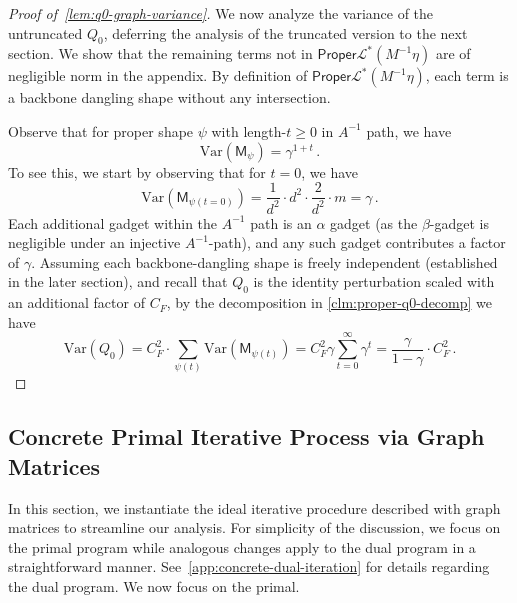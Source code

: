 \documentclass[12pt]{article}
\def \al {\alpha}
\newcommand{\Var}{\mathrm{Var}}
\newcommand{\gam}{\gamma}
\newcommand{\cm}{\mathsf{M} }
\newcommand{\todo}[1]{\textcolor{red}{(#1)}}
\newcommand{\Authornote}[3]{{\sf\footnotesize\color{#3}{[#1: #2]}}}
\newcommand{\Authornote}[3]{}
\newcommand{\anote}[1]{\Authornote{Aaron}{#1}{cyan}}
\begin{document}
\begin{proof}[Proof of~\cref{lem:q0-graph-variance}]
    We now analyze the variance of the untruncated $Q_0$, deferring the analysis of the truncated version to the next section. We show that the remaining terms not in $\mathsf{Proper}\mathcal{L}^{*}(M^{-1}\eta)$ are of negligible norm in the appendix. By definition of $\mathsf{Proper}\mathcal{L}^{*}(M^{-1}\eta)$, each term is a backbone dangling shape without any intersection.
	
	Observe that for proper shape $\psi$ with length-$t\geq 0$ in $A^{-1}$ path, we have \[ 
	\Var(\cm_\psi) = \gam^{1+t}\,.
	\]
	To see this, we start by observing that for $t=0$, we have \[ 
	\Var(\cm_{\psi(t=0)} ) = \frac{1}{d^2} \cdot d^2 \cdot \frac{2}{d^2} \cdot m = \gam \,.
	\]
	Each additional gadget within the $A^{-1}$ path is an $\al$ gadget (as the $\beta$-gadget is negligible under an injective $A^{-1}$-path), and any such gadget contributes a factor of $\gam$. Assuming each backbone-dangling shape is freely independent (established in the later section), and recall that $Q_0$ is the identity perturbation scaled with an additional factor of $C_F$, by the decomposition in \cref{clm:proper-q0-decomp} we have \[ 
	\Var(Q_0) = C_F^2 \cdot \sum_{\psi(t)} \Var(\cm_{\psi(t)})  = C_F^2 \gam \sum_{t=0}^\infty \gam^t = \frac{\gamma}{1-\gam }\cdot C_F^2\,.
	\]
	
	\end{proof}		
\subsection{Concrete Primal Iterative Process via Graph Matrices}\label{sec:concrete-primal-graph-mat}
In this section, we instantiate the ideal iterative procedure described with graph matrices to streamline our analysis. For simplicity of the discussion, we focus on the primal program while analogous changes apply to the dual program in a straightforward manner. See~\cref{app:concrete-dual-iteration} for details regarding the dual program. We now focus on the primal.
\end{document}
